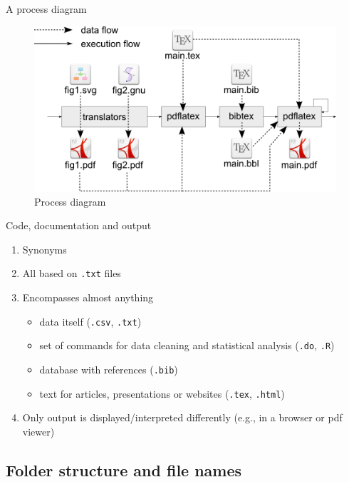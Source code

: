 \documentclass[ignorenonframetext]{beamer}
\begin{document}
{\begin{frame}{A process diagram}

\begin{figure}[htbp]
\centering
\includegraphics[width=\textwidth]{fig/process.png}
\caption{Process diagram}
\end{figure}

\end{frame}

\begin{frame}[fragile]{Code, documentation and output}

\begin{enumerate}
\def\labelenumi{\arabic{enumi}.}
\item
  Synonyms
\item
  All based on \texttt{.txt} files
\item
  Encompasses almost anything

  \begin{itemize}
  \item
    data itself (\texttt{.csv}, \texttt{.txt})
  \item
    set of commands for data cleaning and statistical analysis
    (\texttt{.do}, \texttt{.R})
  \item
    database with references (\texttt{.bib})
  \item
    text for articles, presentations or websites (\texttt{.tex},
    \texttt{.html})
  \end{itemize}
\item
  Only output is displayed/interpreted differently (e.g., in a browser
  or pdf viewer)
\end{enumerate}

\end{frame}

\subsection{Folder structure and file
names}\label{folder-structure-and-file-names}

}
\end{document}
